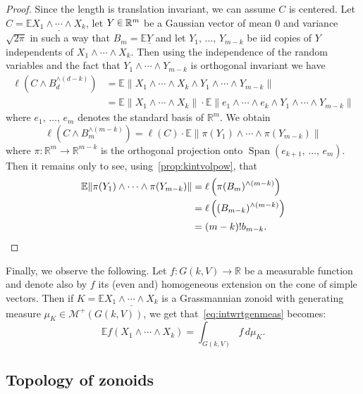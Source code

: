 \documentclass[AHL, Unicode, longabstracts, published]{cedram}
\newcommand{\R}{\mathbb{R}}
\newcommand{\EE}{\mathbb{E}}
\DeclareMathOperator{\Span}{Span}
\newcommand{\Me}{\mathcal{M}}
\newcommand{\seg}{\underline}
\newcommand{\uball}{b}
\newcommand*\randin{
\mathchoice {\raisebox{-.35ex}{$\displaystyle{^\subset}$}\mkern-11.5mu\raisebox{+.45ex}{$\displaystyle{_\subset}$}} {\mkern+1mu\raisebox{-.27ex}{$\textstyle{^\subset}$}\mkern-11.7mu\raisebox{+.45ex}{$\textstyle{_\subset}$}} {\raisebox{.35ex}{$\scriptstyle\subset$}\mkern-14mu\raisebox{-.15ex}{$\scriptstyle\subset$}} {\raisebox{.3ex}{$\scriptscriptstyle\subset$}\mkern-13.5mu\raisebox{-.10ex}{$\scriptscriptstyle\subset$}}}
\begin{document}
\begin{proof}
Since the length is translation invariant, we can assume $C$ is centered. Let $C=\EE\seg{X_1\wedge\cdots\wedge X_k}$, let $Y\,\randin\,\R^m$ be a Gaussian vector of mean $0$ and variance $\sqrt{2\pi}$ in such a way that $B_m=\EE\seg{Y}$ and let $Y_1,\,\ldots,\,Y_{m-k}$ be iid copies of $Y$ independents of $X_1\wedge\cdots\wedge X_k$. Then using the independence of the random variables and the fact that $Y_1\wedge\cdots\wedge Y_{m-k}$ is orthogonal invariant we have
\begin{align*}
\ell\left(C\wedge B_d^{\wedge (d-k) }\right) &=\EE\|X_1\wedge\cdots\wedge X_k\wedge Y_1\wedge\cdots\wedge Y_{m-k}\| \\
&=\EE\|X_1\wedge\cdots\wedge X_k\|\cdot\EE\|e_1\wedge\cdots\wedge e_k\wedge Y_1\wedge\cdots\wedge Y_{m-k}\|
\end{align*}
where $e_1,\,\ldots,\,e_m$ denotes the standard basis of $\R^m$. We obtain
\begin{equation*}
\ell\left(C\wedge B_m^{\wedge (m-k) }\right)=\ell(C)\cdot\EE\| \pi(Y_1)\wedge\cdots\wedge \pi(Y_{m-k})\|
\end{equation*}
where $\pi:\R^m\to\R^{m-k}$ is the orthogonal projection onto $\Span(e_{k+1},\,\ldots,\,e_m)$. Then it remains only to see, using~\cref{prop:kintvolpow}, that
\begin{align*}
\EE\| \pi(Y_1)\wedge\cdots\wedge \pi(Y_{m-k})\|&=\ell\left(\pi(B_m)^{\wedge{(m-k)}}\right)\\
&=\ell\left((B_{m-k})^{\wedge{(m-k)}}\right)\\
&= (m-k)!\uball_{m-k}.\qedhere
\end{align*}
\end{proof}

Finally, we observe the following. Let $f:G(k,V)\to \R$ be a measurable function and denote also by $f$ its (even and) homogeneous extension on the cone of simple vectors. Then if $K=\EE\seg{X_1\wedge\cdots\wedge X_k}$ is a Grassmannian zonoid with generating measure $\mu_K\in\Me^+(G(k,V))$, we get that~\eqref{eq:intwrtgenmeas} becomes:
\begin{equation}\label{eq:intwrtgenmeasgrass}
\EE f(X_1\wedge\cdots\wedge X_k)=\int_{G(k,V)}f\, d\mu_K.
\end{equation}



\subsection{Topology of zonoids}\label{sub:zonoidbundles}
\end{document}
